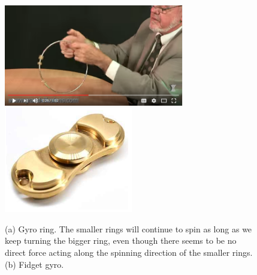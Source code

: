 \begin{figure}[th]
\caption{(a) Gyro ring. The smaller rings will continue to spin as long as
we keep turning the bigger ring, even though there seems to be no direct
force acting along the spinning direction of the smaller rings. (b) Fidget
gyro.}
\label{gyro_fidget_rings}
\begin{center}
\includegraphics[width=0.7\textwidth]{./figs/gyro_ring.png} %
\includegraphics[width=0.5\textwidth]{./figs/fidget_gyro.png}
\end{center}
\end{figure}

\bigskip

